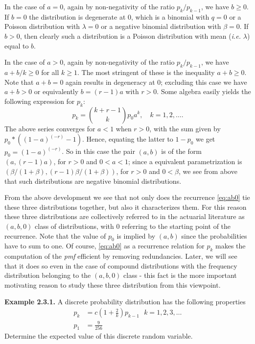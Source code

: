 \documentclass[]{book}
\theoremstyle{definition}
\theoremstyle{definition}
\theoremstyle{definition}
\theoremstyle{remark}
\begin{document}
In the case of \(a=0\), again by non-negativity of the ratio
\(p_k/p_{k-1}\), we have \(b\geq 0\). If \(b=0\) the distribution is
degenerate at \(0\), which is a binomial with \(q=0\) or a Poisson
distribution with \(\lambda=0\) or a negative binomial distribution with
\(\beta=0\). If \(b>0\), then clearly such a distribution is a Poisson
distribution with mean (\emph{i.e.} \(\lambda\)) equal to \(b\).

In the case of \(a>0\), again by non-negativity of the ratio
\(p_k/p_{k-1}\), we have \(a+b/k\geq 0\) for all \(k\geq 1\). The most
stringent of these is the inequality \(a+b\geq 0\). Note that \(a+b=0\)
again results in degeneracy at \(0\); excluding this case we have
\(a+b>0\) or equivalently \(b=(r-1)a\) with \(r>0\). Some algebra easily
yields the following expression for \(p_k\): \[
p_k = \binom{k+r-1}{k} p_0 a^k, \quad k=1,2,\ldots. 
\] The above series converges for \(a<1\) when \(r>0\), with the sum
given by \(p_0*((1-a)^{(-r)}-1)\). Hence, equating the latter to
\(1-p_0\) we get \(p_0=(1-a)^{(-r)}\). So in this case the pair
\((a,b)\) is of the form \((a,(r-1)a)\), for \(r>0\) and \(0<a<1\);
since a equivalent parametrization is
\((\beta/(1+\beta),(r-1)\beta/(1+\beta))\), for \(r>0\) and \(0<\beta\),
we see from above that such distributions are negative binomial
distributions.

From the above development we see that not only does the recurrence
\eqref{eq:ab0} tie these three distributions together, but also it
characterizes them. For this reason these three distributions are
collectively referred to in the actuarial literature as \((a,b,0)\)
class of distributions, with \(0\) referring to the starting point of
the recurrence. Note that the value of \(p_0\) is implied by \((a,b)\)
since the probabilities have to sum to one. Of course, \eqref{eq:ab0} as a
recurrence relation for \(p_k\) makes the computation of the \emph{pmf}
efficient by removing redundancies. Later, we will see that it does so
even in the case of compound distributions with the frequency
distribution belonging to the \((a,b,0)\) class - this fact is the more
important motivating reason to study these three distribution from this
viewpoint.

\textbf{Example 2.3.1.} A discrete probability distribution has the
following properties \[
\begin{aligned}
p_k&=c\left( 1+\frac{2}{k}\right) p_{k-1} \:\:\: k=1,2,3,\ldots\\
p_1&= \frac{9}{256}
\end{aligned}
\] Determine the expected value of this discrete random variable.
\end{document}
